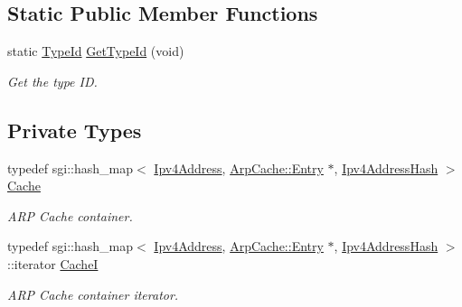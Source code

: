 \subsection*{Static Public Member Functions}
\begin{DoxyCompactItemize}
\item 
static \hyperlink{classns3_1_1TypeId}{Type\+Id} \hyperlink{classns3_1_1ArpCache_adc4d8785f0ea5a83b1248d580cfd9487}{Get\+Type\+Id} (void)
\begin{DoxyCompactList}\small\item\em Get the type ID. \end{DoxyCompactList}\end{DoxyCompactItemize}
\subsection*{Private Types}
\begin{DoxyCompactItemize}
\item 
typedef sgi\+::hash\+\_\+map$<$ \hyperlink{classns3_1_1Ipv4Address}{Ipv4\+Address}, \hyperlink{classns3_1_1ArpCache_1_1Entry}{Arp\+Cache\+::\+Entry} $\ast$, \hyperlink{classns3_1_1Ipv4AddressHash}{Ipv4\+Address\+Hash} $>$ \hyperlink{classns3_1_1ArpCache_a0d745162ea670b114dd1a313c69c4aab}{Cache}
\begin{DoxyCompactList}\small\item\em A\+RP Cache container. \end{DoxyCompactList}\item 
typedef sgi\+::hash\+\_\+map$<$ \hyperlink{classns3_1_1Ipv4Address}{Ipv4\+Address}, \hyperlink{classns3_1_1ArpCache_1_1Entry}{Arp\+Cache\+::\+Entry} $\ast$, \hyperlink{classns3_1_1Ipv4AddressHash}{Ipv4\+Address\+Hash} $>$\+::iterator \hyperlink{classns3_1_1ArpCache_a22c6fbe2d2b3b00d995ed13ec6a0c9cb}{CacheI}
\begin{DoxyCompactList}\small\item\em A\+RP Cache container iterator. \end{DoxyCompactList}\end{DoxyCompactItemize}
